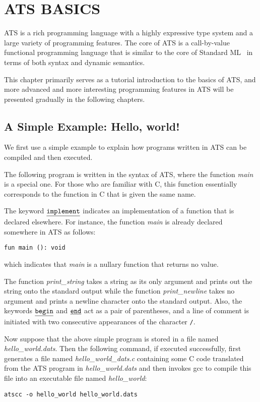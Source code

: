 \chapter{ATS BASICS}

ATS is a rich programming language with a highly expressive type system and
a large variety of programming features. The core of ATS is a call-by-value
functional programming language that is similar to the core of Standard
ML~\cite{SML97} in terms of both syntax and dynamic semantics.

This chapter primarily serves as a tutorial introduction to the basics of
ATS, and more advanced and more interesting programming features in ATS
will be presented gradually in the following chapters.

\section{A Simple Example: Hello, world!}
We first use a simple example to explain how programs written in ATS
can be compiled and then executed.

The following program is written in the syntax of ATS, where the function
{\it main} is a special one. For those who are familiar with C, this
function essentially corresponds to the function in C that is given the
same name.



The keyword $\underline{\texttt{implement}}$ indicates an implementation of a function that
is declared elsewhere. For instance, the function {\it main} is already
declared somewhere in ATS as follows:

\begin{center}
\texttt{fun main (): void}
\end{center}
which indicates that {\it main} is a nullary function that returns no
value.

The function {\it print\_string} takes a string as its only argument and
prints out the string onto the standard output while the function {\it
print\_newline} takes no argument and prints a newline character onto the
standard output. Also, the keywords $\underline{\texttt{begin}}$ and $\underline{\texttt{end}}$ act as a pair
of parentheses, and a line of comment is initiated with two consecutive
appearances of the character \verb`/`.

Now suppose that the above simple program is stored in a file named {\it
hello\_world.dats}. Then the following command, if executed successfully,
first generates a file named {\it hello\_world\_dats.c} containing some C
code translated from the ATS program in {\it hello\_world.dats} and then
invokes gcc to compile this file into an executable file named {\it
hello\_world}:
\begin{verbatim}
atscc -o hello_world hello_world.dats
\end{verbatim}

